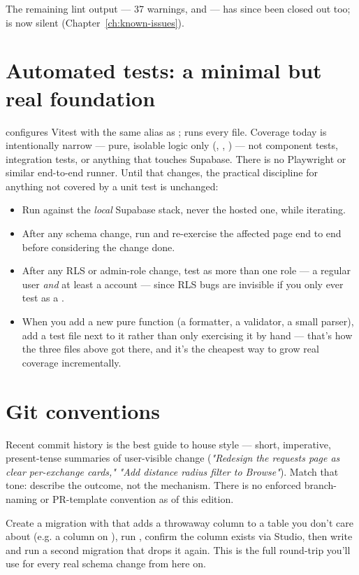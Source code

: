 \begin{olknote}
The remaining lint output — 37 warnings,  and  — has since been closed out too;  is now silent (Chapter~\ref{ch:known-issues}).
\end{olknote}

\section{Automated tests: a minimal but real foundation}

 configures Vitest with the same  alias as ;  runs every  file. Coverage today is intentionally narrow — pure, isolable logic only (, , ) — not component tests, integration tests, or anything that touches Supabase. There is no Playwright or similar end-to-end runner. Until that changes, the practical discipline for anything not covered by a unit test is unchanged:

\begin{itemize}
  \item Run  against the \emph{local} Supabase stack, never the hosted one, while iterating.
  \item After any schema change, run  and re-exercise the affected page end to end before considering the change done.
  \item After any RLS or admin-role change, test as more than one role — a regular user \emph{and} at least a  account — since RLS bugs are invisible if you only ever test as a .
  \item When you add a new pure function (a formatter, a validator, a small parser), add a test file next to it rather than only exercising it by hand — that's how the three files above got there, and it's the cheapest way to grow real coverage incrementally.
\end{itemize}

\section{Git conventions}

Recent commit history is the best guide to house style — short, imperative, present-tense summaries of user-visible change (\emph{"Redesign the requests page as clear per-exchange cards,"} \emph{"Add distance radius filter to Browse"}). Match that tone: describe the outcome, not the mechanism. There is no enforced branch-naming or PR-template convention as of this edition.

\begin{olktask}
Create a migration with  that adds a throwaway column to a table you don't care about (e.g. a  column on ), run , confirm the column exists via Studio, then write and run a second migration that drops it again. This is the full round-trip you'll use for every real schema change from here on.
\end{olktask}
